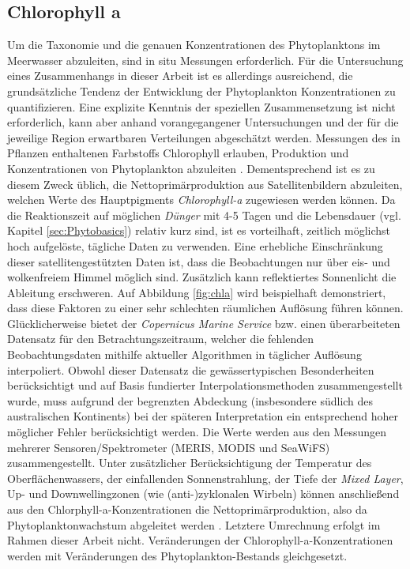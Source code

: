 \documentclass[12pt,a4paper,onecolumn]{scrartcl}
\begin{document}
\subsection{Chlorophyll a} \label{sec:chla}
Um die Taxonomie und die genauen Konzentrationen des Phytoplanktons im Meerwasser abzuleiten, sind in situ Messungen erforderlich. Für die Untersuchung eines Zusammenhangs in dieser Arbeit ist es allerdings ausreichend, die grundsätzliche Tendenz der Entwicklung der Phytoplankton Konzentrationen zu quantifizieren. Eine explizite Kenntnis der speziellen Zusammensetzung ist nicht erforderlich, kann aber anhand vorangegangener Untersuchungen und der für die jeweilige Region erwartbaren Verteilungen abgeschätzt werden. Messungen des in Pflanzen enthaltenen Farbstoffs Chlorophyll erlauben, Produktion und Konzentrationen von Phytoplankton abzuleiten \citep{RYTHER.1957}. Dementsprechend ist es zu diesem Zweck üblich, die Nettoprimärproduktion aus Satellitenbildern abzuleiten, welchen Werte des Hauptpigments \textit{Chlorophyll-a} zugewiesen werden können. Da die Reaktionszeit auf möglichen \textit{Dünger} mit 4-5 Tagen und die Lebensdauer (vgl. Kapitel \ref{sec:Phytobasics}) relativ kurz sind, ist es vorteilhaft, zeitlich möglichst hoch aufgelöste, tägliche Daten zu verwenden. Eine erhebliche Einschränkung dieser satellitengestützten Daten ist, dass die Beobachtungen nur über eis- und wolkenfreiem Himmel möglich sind. Zusätzlich kann reflektiertes Sonnenlicht die Ableitung erschweren. Auf Abbildung \ref{fig:chla} wird beispielhaft demonstriert, dass diese Faktoren zu einer sehr schlechten räumlichen Auflösung führen können. Glücklicherweise bietet der \textit{Copernicus Marine Service} bzw. \citet{Saulquin.2019} einen überarbeiteten Datensatz für den Betrachtungszeitraum, welcher die fehlenden Beobachtungsdaten mithilfe aktueller Algorithmen in täglicher Auflösung interpoliert. Obwohl dieser Datensatz die gewässertypischen Besonderheiten berücksichtigt und auf Basis fundierter Interpolationsmethoden zusammengestellt wurde, muss aufgrund der begrenzten Abdeckung (insbesondere südlich des australischen Kontinents) bei der späteren Interpretation ein entsprechend hoher möglicher Fehler berücksichtigt werden. Die Werte werden aus den Messungen mehrerer Sensoren/Spektrometer (MERIS, MODIS und SeaWiFS) zusammengestellt. Unter zusätzlicher Berücksichtigung der Temperatur des Oberflächenwassers, der einfallenden Sonnenstrahlung, der Tiefe der \textit{Mixed Layer}, Up- und Downwellingzonen (wie (anti-)zyklonalen Wirbeln) können anschließend aus den Chlorphyll-a-Konzentrationen die Nettoprimärproduktion, also da Phytoplanktonwachstum abgeleitet werden \citep{Falkowski.1998}. Letztere Umrechnung erfolgt im Rahmen dieser Arbeit nicht. Veränderungen der Chlorophyll-a-Konzentrationen werden mit Veränderungen des Phytoplankton-Bestands gleichgesetzt.
\end{document}
